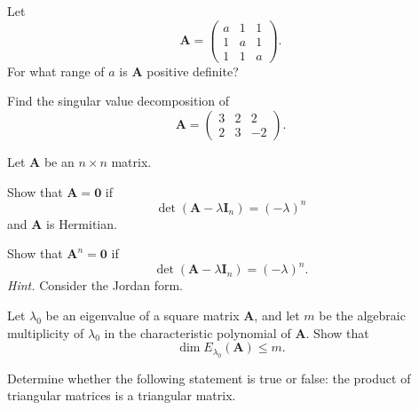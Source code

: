 \begin{problem}
Let
\[
\mathbf A=
\begin{pmatrix}
a&1&1\\
1&a&1\\
1&1&a
\end{pmatrix}.
\]
For what range of $a$ is $\mathbf A$ positive definite?
\end{problem}

\begin{problem}
Find the singular value decomposition of
\[
\mathbf A=
\begin{pmatrix}
3&2&2\\
2&3&-2
\end{pmatrix}.
\]
\end{problem}

\begin{problem}
Let $\mathbf A$ be an $n\times n$ matrix.
\begin{problemsubparts}
\item Show that $\mathbf A=\mathbf 0$ if
\[
\det(\mathbf A-\lambda\mathbf I_n)=(-\lambda)^n
\]
and $\mathbf A$ is Hermitian.
\item Show that $\mathbf A^n=\mathbf 0$ if
\[
\det(\mathbf A-\lambda\mathbf I_n)=(-\lambda)^n.
\]
\textit{Hint.} Consider the Jordan form.
\end{problemsubparts}
\end{problem}

\begin{problem}
Let $\lambda_0$ be an eigenvalue of a square matrix $\mathbf A$, and let $m$ be the algebraic multiplicity of $\lambda_0$ in the characteristic polynomial of $\mathbf A$. Show that
\[
\dim E_{\lambda_0}(\mathbf A)\le m.
\]
\end{problem}

\begin{problem}
Determine whether the following statement is true or false: the product of triangular matrices is a triangular matrix.
\end{problem}

